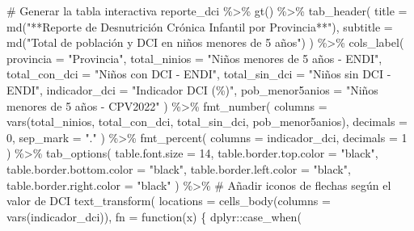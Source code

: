 \documentclass[
  letterpaper,
  DIV=11,
  numbers=noendperiod]{scrreprt}
\newenvironment{Shaded}{\begin{snugshade}}{\end{snugshade}}
\newcommand{\AttributeTok}[1]{\textcolor[rgb]{0.40,0.45,0.13}{#1}}
\newcommand{\CommentTok}[1]{\textcolor[rgb]{0.37,0.37,0.37}{#1}}
\newcommand{\ControlFlowTok}[1]{\textcolor[rgb]{0.00,0.23,0.31}{#1}}
\newcommand{\DecValTok}[1]{\textcolor[rgb]{0.68,0.00,0.00}{#1}}
\newcommand{\FunctionTok}[1]{\textcolor[rgb]{0.28,0.35,0.67}{#1}}
\newcommand{\NormalTok}[1]{\textcolor[rgb]{0.00,0.23,0.31}{#1}}
\newcommand{\SpecialCharTok}[1]{\textcolor[rgb]{0.37,0.37,0.37}{#1}}
\newcommand{\StringTok}[1]{\textcolor[rgb]{0.13,0.47,0.30}{#1}}
\begin{document}
\begin{Shaded}
\begin{Highlighting}[]
\CommentTok{\# Generar la tabla interactiva}
\NormalTok{reporte\_dci }\SpecialCharTok{\%\textgreater{}\%}
    \FunctionTok{gt}\NormalTok{() }\SpecialCharTok{\%\textgreater{}\%}
    \FunctionTok{tab\_header}\NormalTok{(}
        \AttributeTok{title =} \FunctionTok{md}\NormalTok{(}\StringTok{"**Reporte de Desnutrición Crónica Infantil por Provincia**"}\NormalTok{),}
        \AttributeTok{subtitle =} \FunctionTok{md}\NormalTok{(}\StringTok{"Total de población y DCI en niños menores de 5 años"}\NormalTok{)}
\NormalTok{    ) }\SpecialCharTok{\%\textgreater{}\%}
    \FunctionTok{cols\_label}\NormalTok{(}
        \AttributeTok{provincia =} \StringTok{"Provincia"}\NormalTok{,}
        \AttributeTok{total\_ninios =} \StringTok{"Niños menores de 5 años {-} ENDI"}\NormalTok{,}
        \AttributeTok{total\_con\_dci =} \StringTok{"Niños con DCI {-} ENDI"}\NormalTok{,}
        \AttributeTok{total\_sin\_dci =} \StringTok{"Niños sin DCI {-} ENDI"}\NormalTok{,}
        \AttributeTok{indicador\_dci =} \StringTok{"Indicador DCI (\%)"}\NormalTok{,}
        \AttributeTok{pob\_menor5anios =} \StringTok{"Niños menores de 5 años {-} CPV2022"}
\NormalTok{    ) }\SpecialCharTok{\%\textgreater{}\%}
    \FunctionTok{fmt\_number}\NormalTok{(}
        \AttributeTok{columns =} \FunctionTok{vars}\NormalTok{(total\_ninios, total\_con\_dci, total\_sin\_dci, pob\_menor5anios),}
        \AttributeTok{decimals =} \DecValTok{0}\NormalTok{,}
        \AttributeTok{sep\_mark =} \StringTok{"."}
\NormalTok{    ) }\SpecialCharTok{\%\textgreater{}\%}
    \FunctionTok{fmt\_percent}\NormalTok{(}
        \AttributeTok{columns =}\NormalTok{ indicador\_dci,}
        \AttributeTok{decimals =} \DecValTok{1}
\NormalTok{    ) }\SpecialCharTok{\%\textgreater{}\%}
    \FunctionTok{tab\_options}\NormalTok{(}
        \AttributeTok{table.font.size =} \DecValTok{14}\NormalTok{,}
        \AttributeTok{table.border.top.color =} \StringTok{"black"}\NormalTok{,}
        \AttributeTok{table.border.bottom.color =} \StringTok{"black"}\NormalTok{,}
        \AttributeTok{table.border.left.color =} \StringTok{"black"}\NormalTok{,}
        \AttributeTok{table.border.right.color =} \StringTok{"black"}
\NormalTok{    ) }\SpecialCharTok{\%\textgreater{}\%}
    \CommentTok{\# Añadir iconos de flechas según el valor de DCI}
    \FunctionTok{text\_transform}\NormalTok{(}
        \AttributeTok{locations =} \FunctionTok{cells\_body}\NormalTok{(}\AttributeTok{columns =} \FunctionTok{vars}\NormalTok{(indicador\_dci)),}
        \AttributeTok{fn =} \ControlFlowTok{function}\NormalTok{(x) \{}
\NormalTok{            dplyr}\SpecialCharTok{::}\FunctionTok{case\_when}\NormalTok{(}

\end{Highlighting}
\end{Shaded}
\end{document}
